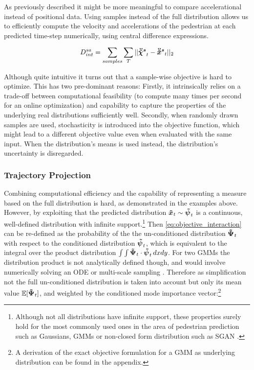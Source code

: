 As previously described it might be more meaningful to compare accelerational instead of positional data. Using samples instead of the full distribution allows us to efficiently compute the velocity and accelerations of the pedestrian at each predicted time-step numerically, using central difference expressions. 

\begin{equation}
D_{int}^{sa} = \sum_{samples} \sum_T ||\ddxpedwo[s]_t - \ddxped[s]_t||_2
\end{equation}

Although quite intuitive it turns out that a sample-wise objective is hard to optimize. This has two pre-dominant reasons: Firstly, it intrinsically relies on a trade-off between computational feasibility (to compute many times per second for an online optimization) and capability to capture the properties of the underlying real distributions sufficiently well. Secondly, when randomly drawn samples are used, stochasticity is introduced into the objective function, which might lead to a different objective value even when evaluated with the same input. When the distribution's means is used instead, the distribution's uncertainty is disregarded. 

\subsubsection{Trajectory Projection}
Combining computational efficiency and the capability of representing a measure based on the full distribution is hard, as demonstrated in the examples above. However, by exploiting that the predicted distribution $\xped[]_t \sim \dist[]_t$ is a continuous, well-defined distribution with infinite support.\footnote{Although not all distributions have infinite support, these properties surely hold for the most commonly used ones in the area of pedestrian prediction such as Gaussians, \ac{GMM}s \cite{Salzmann2020} or non-closed form distribution such as SGAN \cite{Gupta2018}.} Then \ref{eq:objective_interaction} can be re-defined as the probability of the the un-conditioned distribution $\distwo[]_t$ with respect to the conditioned distribution $\dist[]_t$, which is equivalent to the integral over the product distribution $\int \int \distwo[]_t \cdot \dist[]_t \, dxdy$.
\newline
For two \ac{GMM}s the distribution product is not analytically defined though, and would involve numerically solving an \ac{ODE} \cite{Schrempf2005} or multi-scale sampling \cite{Ihler2003}. Therefore as simplification not the full un-conditioned distribution is taken into account but only its mean value $\mathbb{E}[\distwo[]_t]$, and weighted by the conditioned mode importance vector:\footnote{A derivation of the exact objective formulation for a \ac{GMM} as underlying distribution can be found in the appendix.} 

